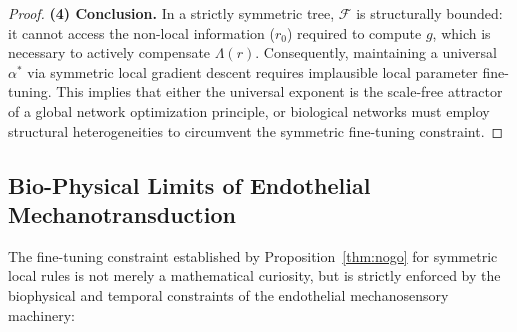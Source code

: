 \begin{proof}
\textbf{(4) Conclusion.} In a strictly symmetric tree, $\mathcal{F}$ is
structurally bounded: it cannot access the non-local information ($r_0$)
required to compute $g$, which is necessary to actively compensate $\Lambda(r)$.
Consequently, maintaining a universal $\alpha^*$ via symmetric local gradient
descent requires implausible local parameter fine-tuning. This implies that
either the universal exponent is the scale-free attractor of a global network
optimization principle, or biological networks must employ structural
heterogeneities to circumvent the symmetric fine-tuning constraint.
\end{proof}

\subsection{Bio-Physical Limits of Endothelial Mechanotransduction}
\label{sec:biophysical_limits}

The fine-tuning constraint established by Proposition~\ref{thm:nogo} for
symmetric local rules is not merely a mathematical curiosity, but is strictly
enforced by the biophysical and temporal constraints of the endothelial
mechanosensory machinery:

